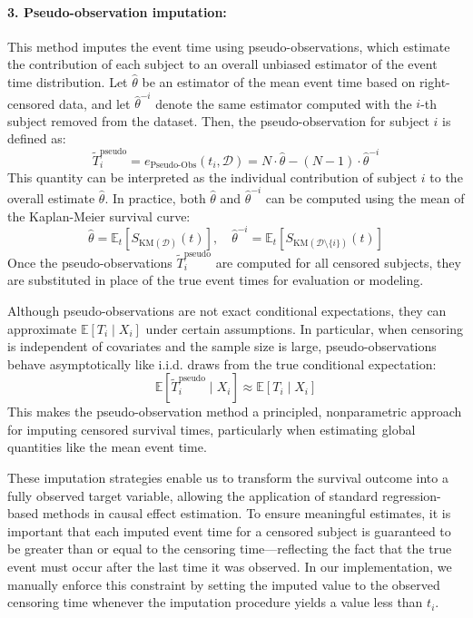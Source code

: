 \documentclass{article} %
\begin{document}
\paragraph{3. Pseudo-observation imputation:}
This method imputes the event time using pseudo-observations, which estimate the contribution of each subject to an overall unbiased estimator of the event time distribution. Let \( \hat{\theta} \) be an estimator of the mean event time based on right-censored data, and let \( \hat{\theta}^{-i} \) denote the same estimator computed with the \( i \)-th subject removed from the dataset. Then, the pseudo-observation for subject \( i \) is defined as:
\begin{equation}
\tilde{T}^{\text{pseudo}}_i = e_{\text{Pseudo-Obs}}(t_i, \mathcal{D}) 
= N \cdot \hat{\theta} - (N - 1) \cdot \hat{\theta}^{-i}
\end{equation}
This quantity can be interpreted as the individual contribution of subject \( i \) to the overall estimate \( \hat{\theta} \). In practice, both \( \hat{\theta} \) and \( \hat{\theta}^{-i} \) can be computed using the mean of the Kaplan-Meier survival curve:
\[
\hat{\theta} = \mathbb{E}_t[S_{\text{KM}(\mathcal{D})}(t)], \quad
\hat{\theta}^{-i} = \mathbb{E}_t[S_{\text{KM}(\mathcal{D} \setminus \{i\})}(t)]
\]
Once the pseudo-observations \( \tilde{T}^{\text{pseudo}}_i \) are computed for all censored subjects, they are substituted in place of the true event times for evaluation or modeling. 

Although pseudo-observations are not exact conditional expectations, they can approximate \( \mathbb{E}[T_i \mid X_i] \) under certain assumptions. In particular, when censoring is independent of covariates and the sample size is large, pseudo-observations behave asymptotically like i.i.d. draws from the true conditional expectation:
\[
\mathbb{E}[\tilde{T}^{\text{pseudo}}_i \mid X_i] \approx \mathbb{E}[T_i \mid X_i]
\]
This makes the pseudo-observation method a principled, nonparametric approach for imputing censored survival times, particularly when estimating global quantities like the mean event time.

These imputation strategies enable us to transform the survival outcome into a fully observed target variable, allowing the application of standard regression-based methods in causal effect estimation. 
To ensure meaningful estimates, it is important that each imputed event time for a censored subject is guaranteed to be greater than or equal to the censoring time---reflecting the fact that the true event must occur after the last time it was observed. 
In our implementation, we manually enforce this constraint by setting the imputed value to the observed censoring time whenever the imputation procedure yields a value less than \( t_i \).
\end{document}
